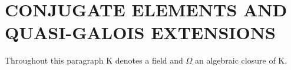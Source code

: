 \section{CONJUGATE ELEMENTS AND QUASI-GALOIS EXTENSIONS}

Throughout this paragraph K denotes a field and \(\Omega\) an algebraic closure of K.

